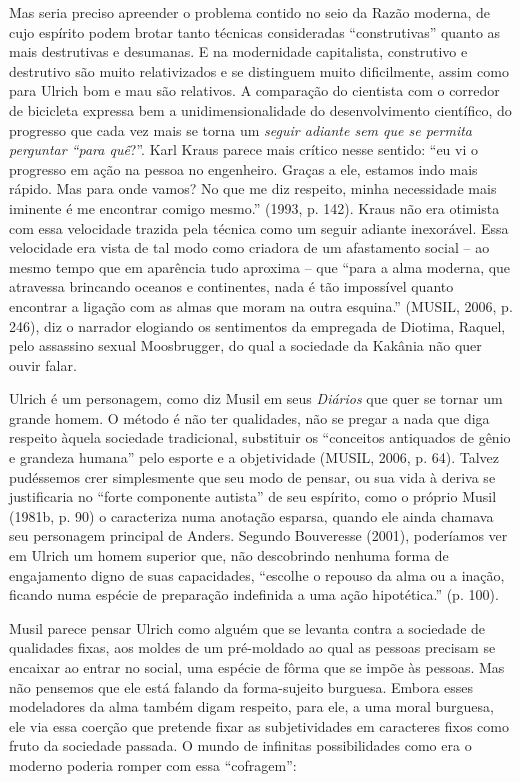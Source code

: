 Mas seria preciso apreender o problema contido no seio da Razão moderna,
de cujo espírito podem brotar tanto técnicas consideradas
``construtivas'' quanto as mais destrutivas e desumanas. E na
modernidade capitalista, construtivo e destrutivo são muito
relativizados e se distinguem muito dificilmente, assim como para Ulrich
bom e mau são relativos. A comparação do cientista com o corredor de
bicicleta expressa bem a unidimensionalidade do desenvolvimento
científico, do progresso que cada vez mais se torna um \emph{seguir
adiante sem que se permita perguntar ``para quê}?''. Karl Kraus parece
mais crítico nesse sentido: ``eu vi o progresso em ação na pessoa no
engenheiro. Graças a ele, estamos indo mais rápido. Mas para onde vamos?
No que me diz respeito, minha necessidade mais iminente é me encontrar
comigo mesmo.'' (1993, p. 142). Kraus não era otimista com essa
velocidade trazida pela técnica como um seguir adiante inexorável. Essa
velocidade era vista de tal modo como criadora de um afastamento social
-- ao mesmo tempo que em aparência tudo aproxima -- que ``para a alma
moderna, que atravessa brincando oceanos e continentes, nada é tão
impossível quanto encontrar a ligação com as almas que moram na outra
esquina.'' (MUSIL, 2006, p. 246), diz o narrador elogiando os
sentimentos da empregada de Diotima, Raquel, pelo assassino sexual
Moosbrugger, do qual a sociedade da Kakânia não quer ouvir falar.

Ulrich é um personagem, como diz Musil em seus \emph{Diários} que quer
se tornar um grande homem. O método é não ter qualidades, não se pregar
a nada que diga respeito àquela sociedade tradicional, substituir os
``conceitos antiquados de gênio e grandeza humana'' pelo esporte e a
objetividade (MUSIL, 2006, p. 64). Talvez pudéssemos crer simplesmente
que seu modo de pensar, ou sua vida à deriva se justificaria no ``forte
componente autista'' de seu espírito, como o próprio Musil (1981b, p.
90) o caracteriza numa anotação esparsa, quando ele ainda chamava seu
personagem principal de Anders. Segundo Bouveresse (2001), poderíamos
ver em Ulrich um homem superior que, não descobrindo nenhuma forma de
engajamento digno de suas capacidades, ``escolhe o repouso da alma ou a
inação, ficando numa espécie de preparação indefinida a uma ação
hipotética.'' (p. 100).

Musil parece pensar Ulrich como alguém que se levanta contra a sociedade
de qualidades fixas, aos moldes de um pré-moldado ao qual as pessoas
precisam se encaixar ao entrar no social, uma espécie de fôrma que se
impõe às pessoas. Mas não pensemos que ele está falando da forma-sujeito
burguesa. Embora esses modeladores da alma também digam respeito, para
ele, a uma moral burguesa, ele via essa coerção que pretende fixar as
subjetividades em caracteres fixos como fruto da sociedade passada. O
mundo de infinitas possibilidades como era o moderno poderia romper com
essa ``cofragem'':


